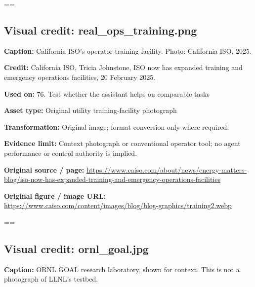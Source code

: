 \documentclass[10pt,letterpaper]{article}
\begin{document}
\egroup\par\noindent\box\readingEntry\par\medskip
\setbox\readingEntry=\vbox\bgroup\hsize=\linewidth\subsection*{Visual credit: real\_ops\_training.png}
\textbf{Caption:} California ISO's operator-training facility. Photo: California ISO, 2025.\par
\textbf{Credit:} California ISO, Tricia Johnstone, ISO now has expanded training and emergency operations facilities, 20 February 2025.\par
\textbf{Used on:} 76. Test whether the assistant helps on comparable tasks\par
\textbf{Asset type:} Original utility training-facility photograph\par
\textbf{Transformation:} Original image; format conversion only where required.\par
\textbf{Evidence limit:} Context photograph or conventional operator tool; no agent performance or control authority is implied.\par
\textbf{Original source / page:} \href{https://www.caiso.com/about/news/energy-matters-blog/iso-now-has-expanded-training-and-emergency-operations-facilities}{\small\ttfamily https:/\allowbreak{}/\allowbreak{}www.\allowbreak{}caiso.\allowbreak{}com/\allowbreak{}about/\allowbreak{}news/\allowbreak{}energy-\allowbreak{}matters-\allowbreak{}blog/\allowbreak{}iso-\allowbreak{}now-\allowbreak{}has-\allowbreak{}expanded-\allowbreak{}training-\allowbreak{}and-\allowbreak{}emergency-\allowbreak{}operations-\allowbreak{}facilities}\par
\textbf{Original figure / image URL:} \href{https://www.caiso.com/content/images/blog/blog-graphics/training2.webp}{\small\ttfamily https:/\allowbreak{}/\allowbreak{}www.\allowbreak{}caiso.\allowbreak{}com/\allowbreak{}content/\allowbreak{}images/\allowbreak{}blog/\allowbreak{}blog-\allowbreak{}graphics/\allowbreak{}training2.\allowbreak{}webp}\par
\egroup\par\noindent\box\readingEntry\par\medskip
\setbox\readingEntry=\vbox\bgroup\hsize=\linewidth\subsection*{Visual credit: ornl\_goal.jpg}
\textbf{Caption:} ORNL GOAL research laboratory, shown for context. This is not a photograph of LLNL's testbed.\par
\end{document}
